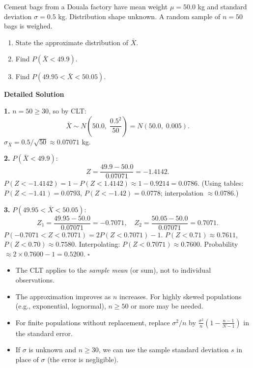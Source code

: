 \documentclass[11pt]{article}
\providecommand{\qed}{\hfill$\square$}
\begin{document}
\begin{exoresolu}
Cement bags from a Douala factory have mean weight $\mu = 50.0$ kg and standard deviation $\sigma = 0.5$ kg. Distribution shape unknown. A random sample of $n=50$ bags is weighed.
\begin{enumerate}
\item State the approximate distribution of $\bar{X}$.
\item Find $P(\bar{X} < 49.9)$.
\item Find $P(49.95 < \bar{X} < 50.05)$.
\end{enumerate}
\tcblower
\textbf{Detailed Solution}

\textbf{1.} $n=50 \ge 30$, so by CLT:
\[
\bar{X} \sim N\left(50.0,\; \frac{0.5^2}{50}\right) = N(50.0,\; 0.005).
\]
$\sigma_{\bar{X}} = 0.5/\sqrt{50} \approx 0.07071$ kg.

\textbf{2.} $P(\bar{X} < 49.9)$:
\[
Z = \frac{49.9 - 50.0}{0.07071} = -1.4142.
\]
$P(Z < -1.4142) = 1 - P(Z < 1.4142) \approx 1 - 0.9214 = 0.0786$.
(Using tables: $P(Z < -1.41) = 0.0793$, $P(Z < -1.42) = 0.0778$; interpolation $\approx 0.0786$.)

\textbf{3.} $P(49.95 < \bar{X} < 50.05)$:
\[
Z_1 = \frac{49.95-50.0}{0.07071} = -0.7071,\quad Z_2 = \frac{50.05-50.0}{0.07071} = 0.7071.
\]
$P(-0.7071 < Z < 0.7071) = 2P(Z < 0.7071) - 1$.
$P(Z < 0.71) \approx 0.7611$, $P(Z < 0.70) \approx 0.7580$. Interpolating: $P(Z < 0.7071) \approx 0.7600$.
Probability $\approx 2\times0.7600 - 1 = 0.5200$. \qed
\end{exoresolu}

\begin{aretenir}
\begin{itemize}
\item The CLT applies to the \emph{sample mean} (or sum), not to individual observations.
\item The approximation improves as $n$ increases. For highly skewed populations (e.g., exponential, lognormal), $n \ge 50$ or more may be needed.
\item For finite populations without replacement, replace $\sigma^2/n$ by $\frac{\sigma^2}{n}\left(1-\frac{n-1}{N-1}\right)$ in the standard error.
\item If $\sigma$ is unknown and $n \ge 30$, we can use the sample standard deviation $s$ in place of $\sigma$ (the error is negligible).
\end{itemize}
\end{aretenir}
\end{document}
